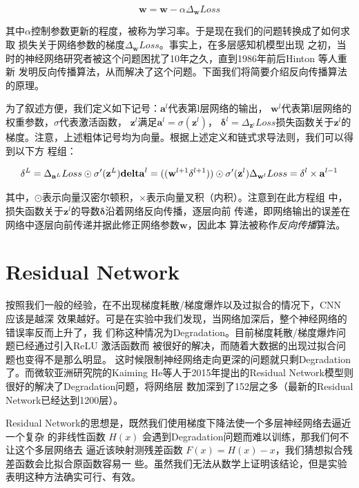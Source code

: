 \[
\mathbf{w} = \mathbf{w} - \alpha\Delta_{\mathbf{w}}{Loss}
\]

其中$\alpha$控制参数更新的程度，被称为学习率。于是现在我们的问题转换成了如何求取
损失关于网络参数的梯度$\Delta_{\mathbf{w}}{Loss}$。事实上，在多层感知机模型出现
之初，当时的神经网络研究者被这个问题困扰了10年之久，直到1986年前后Hinton 等人重新
发明反向传播算法，从而解决了这个问题。下面我们将简要介绍反向传播算法的原理。

为了叙述方便，我们定义如下记号：$\mathbf{a}^{l}$代表第l层网络的输出，
$\mathbf{w}^{l}$代表第l层网络的权重参数，$\sigma$代表激活函数，
$\mathbf{z}^{l}$满足$\mathbf{a}^{l} = \sigma(\mathbf{z}^{l})$，
$\mathbf{\delta}^{l} = \Delta_{\mathbf{z}^l}{Loss}$损失函数关于$\mathbf{z}^l$的
梯度。注意，上述粗体记号均为向量。根据上述定义和链式求导法则，我们可以得到以下方
程组：

\[
  \mathbf{\delta}^L = \Delta_{\mathbf{a}^L}{Loss} \odot \sigma'(\mathbf{z}^L) \\
  \mathbf{delta}^l = ((\mathbf{w}^{l+1}\mathbf{\delta}^{l+1})) \odot \sigma'(\mathbf{z}^l) \\
  \Delta_{\mathbf{w}^l}{Loss} = \mathbf{\delta}^l \times \mathbf{a}^{l-1} \\
\]

其中，$\odot$表示向量汉密尔顿积，$\times$表示向量叉积（内积）。注意到在此方程组
中，损失函数关于$\mathbf{z}^l$的导数$\mathbf{\delta}$沿着网络反向传播，逐层向前
传递，即网络输出的误差在网络中逐层向前传递并据此修正网络参数$\mathbf{w}$，因此本
算法被称作\textit{反向传播}算法。

\section{Residual Network}

按照我们一般的经验，在不出现梯度耗散/梯度爆炸以及过拟合的情况下，CNN 应该是越深
效果越好。可是在实验中我们发现，当网络加深后，整个神经网络的错误率反而上升了，我
们称这种情况为Degradation。目前梯度耗散/梯度爆炸问题已经通过引入ReLU 激活函数而
被很好的解决\cite{Nair:2010vq}，而随着大数据的出现过拟合问题也变得不是那么明显。
这时候限制神经网络走向更深的问题就只剩Degradation了。而微软亚洲研究院的Kaiming
He等人于2015年提出的Residual Network模型则很好的解决了Degradation问题，将网络层
数加深到了152层之多（最新的Residual Network已经达到1200层）。

Residual Network的思想是，既然我们使用梯度下降法使一个多层神经网络去逼近一个复杂
的非线性函数 $H(x)$ 会遇到Degradation问题而难以训练，那我们何不让这个多层网络去
逼近该映射测残差函数 $F(x) = H(x) - x$，我们猜想拟合残差函数会比拟合原函数容易一
些。虽然我们无法从数学上证明该结论，但是实验表明这种方法确实可行、有效。

